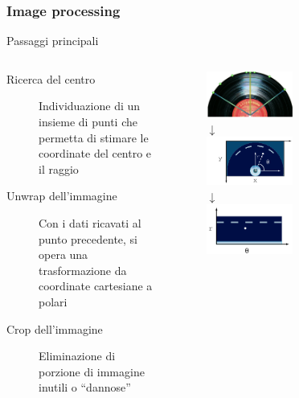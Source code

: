 \begin{frame}
\frametitle{Image processing}
\begin{block}{Passaggi principali}
\begin{columns}[t]
\begin{column}{6.5cm}
\begin{description}
\item[Ricerca del centro] Individuazione di un insieme di punti che permetta 
di stimare le coordinate del centro e il raggio
\item[Unwrap dell'immagine] Con i dati ricavati al punto precedente, si
opera una trasformazione da coordinate cartesiane a polari
\item[Crop dell'immagine] Eliminazione di porzione di immagine inutili o
``dannose''
\end{description}
\end{column}
\vline
\begin{column}{3.5cm}
\begin{figure}
\includegraphics[width=0.5\textwidth]{immagini/center.png}\\
$\downarrow$\\
\includegraphics[width=0.5\textwidth]{immagini/cartesio.png}\\
$\downarrow$\\
\vspace{.2cm}
\includegraphics[width=0.5\textwidth]{immagini/polare.png}
\end{figure}
\end{column}
\end{columns}
\end{block}
\end{frame}

